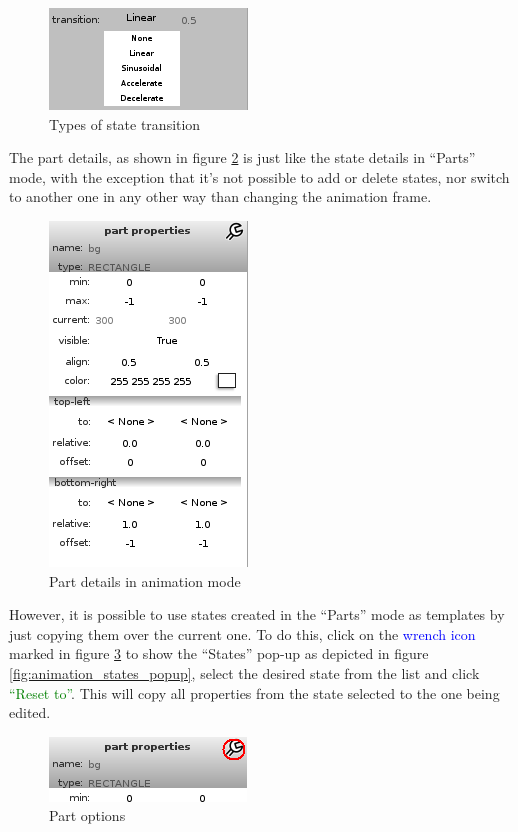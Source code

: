 \documentclass[a4paper]{profusion}
\newcommand{\GUIButton}[1]{\textcolor{green}{#1}} %
\newcommand{\GUIIcon}[1]{\textcolor{blue}{#1}}    %
\begin{document}
\begin{figure}[h!]
  \centering
  \includegraphics{images/animation_transitions.png}
  \caption{Types of state transition}
  \label{fig:animation_transitions}
\end{figure}

  The part details, as shown in figure \ref{fig:animation_part_details} is
  just like the state details in ``Parts'' mode, with the exception that
  it's not possible to add or delete states, nor switch to another one in
  any other way than changing the animation frame.

\begin{figure}[h!]
  \centering
  \includegraphics{images/animation_part_details.png}
  \caption{Part details in animation mode}
  \label{fig:animation_part_details}
\end{figure}

  However, it is possible to use states created in the ``Parts'' mode
  as templates by just copying them over the current one. To do this,
  click on the \GUIIcon{wrench icon} marked in figure
  \ref{fig:animation_part_options} to show the ``States'' pop-up as
  depicted in figure \ref{fig:animation_states_popup}, select the
  desired state from the list and click \GUIButton{``Reset to''}. This
  will copy all properties from the state selected to the one being
  edited.

\begin{figure}[h!]
  \centering
  \includegraphics{images/animation_part_options.png}
  \caption{Part options}
  \label{fig:animation_part_options}
\end{figure}
\end{document}

